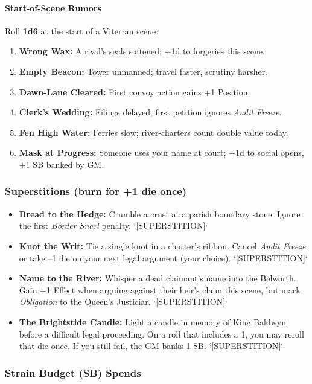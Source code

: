 \begin{itemize}[nosep]
\paragraph{Start-of-Scene Rumors}
Roll \textbf{1d6} at the start of a Viterran scene:
\begin{enumerate}[nosep]
  \item \textbf{Wrong Wax:} A rival's seals softened; +1d to forgeries this scene.
  \item \textbf{Empty Beacon:} Tower unmanned; travel faster, scrutiny harsher.
  \item \textbf{Dawn-Lane Cleared:} First convoy action gains +1 Position.
  \item \textbf{Clerk's Wedding:} Filings delayed; first petition ignores \emph{Audit Freeze}.
  \item \textbf{Fen High Water:} Ferries slow; river-charters count double value today.
  \item \textbf{Mask at Progress:} Someone uses your name at court; +1d to social opens, +1 SB banked by GM.
\end{enumerate}

\subsubsection{Superstitions (burn for +1 die once)}

\begin{itemize}[nosep]
  \item \textbf{Bread to the Hedge:} Crumble a crust at a parish boundary stone. Ignore the first \emph{Border Snarl} penalty. `[SUPERSTITION]`
  \item \textbf{Knot the Writ:} Tie a single knot in a charter's ribbon. Cancel \emph{Audit Freeze} or take --1 die on your next legal argument (your choice). `[SUPERSTITION]`
  \item \textbf{Name to the River:} Whisper a dead claimant's name into the Belworth. Gain +1 Effect when arguing against their heir's claim this scene, but mark \emph{Obligation} to the Queen's Justiciar. `[SUPERSTITION]`
  \item \textbf{The Brightstide Candle:} Light a candle in memory of King Baldwyn before a difficult legal proceeding. On a roll that includes a 1, you may reroll that die once. If you still fail, the GM banks 1 SB. `[SUPERSTITION]`
\end{itemize}

\subsubsection{Strain Budget (SB) Spends}


\end{itemize}

